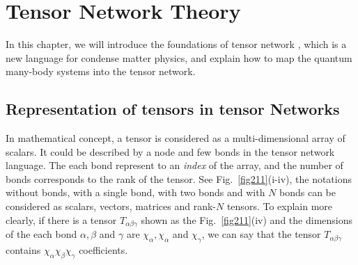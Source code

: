 \chapter{Tensor Network Theory} 
In this chapter, we will introduce the foundations of tensor network \cite{jordan_studies_2011,Orus2014117,bauer_tensor_2011}, which is a new language for condense matter physics, and explain how to map the quantum many-body systems into the tensor network. 

\section{Representation of tensors in tensor Networks}
\label{notations}

In mathematical concept, a tensor is considered as a multi-dimensional array of scalars. It could be described by a node and few bonds in the tensor network language. The each bond represent to an \textit{index} of the array, and the number of bonds corresponds to the rank of the tensor. See Fig.~\ref{fig211}(i-iv), the notations without bonds, with a single bond, with two bonds and with $N$ bonds can be considered as scalars, vectors, matrices and rank-$N$ tensors. To explain more clearly, if there is a tensor $T_{\alpha \beta \gamma}$ shown as the Fig.~\ref{fig211}(iv) and the dimensions of the each bond $\alpha, \beta$ and $\gamma$ are $\chi_{\alpha},\chi_{\alpha}$ and $\chi_{\gamma}$, we can say that the tensor $T_{\alpha \beta \gamma}$ contains $\chi_{\alpha}\chi_{\beta}\chi_{\gamma}$ coefficients.


